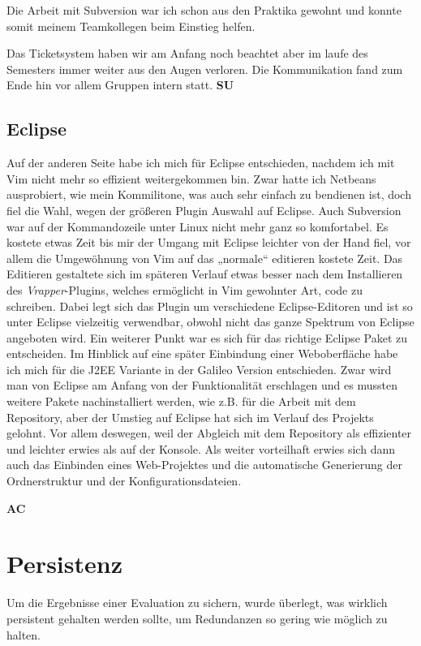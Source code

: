 \documentclass[titlepage, 12pt,a4paper]{scrartcl}
\begin{document}
Die Arbeit mit Subversion war ich schon aus den Praktika gewohnt und konnte
somit meinem Teamkollegen beim Einstieg helfen.

Das Ticketsystem haben wir am Anfang noch beachtet aber im laufe des Semesters
immer weiter aus den Augen verloren. Die Kommunikation fand zum Ende hin vor allem
Gruppen intern statt.
{\bf{SU}}

\subsection{Eclipse}
Auf der anderen Seite habe ich mich für Eclipse entschieden, nachdem ich mit
Vim nicht mehr so effizient weitergekommen bin. Zwar hatte ich Netbeans
ausprobiert, wie mein Kommilitone, was auch sehr einfach zu bendienen ist, doch
fiel die Wahl, wegen der größeren Plugin Auswahl auf Eclipse. Auch Subversion
war auf der Kommandozeile unter Linux nicht mehr ganz so komfortabel. Es kostete
etwas Zeit bis mir der Umgang mit Eclipse leichter von der Hand fiel, vor allem
die Umgewöhnung von Vim auf das „normale“ editieren kostete Zeit. Das Editieren
gestaltete sich im späteren Verlauf etwas besser nach dem Installieren des
\emph{Vrapper}-Plugins, welches ermöglicht in Vim gewohnter Art, code zu
schreiben. Dabei legt sich das Plugin um verschiedene Eclipse-Editoren und ist
so unter Eclipse vielzeitig verwendbar, obwohl nicht das ganze Spektrum von
Eclipse angeboten wird. Ein weiterer Punkt war es sich für das richtige Eclipse
Paket zu entscheiden. Im Hinblick auf eine später Einbindung einer
Weboberfläche habe ich mich für die J2EE Variante in der Galileo Version
entschieden. Zwar wird man von Eclipse am Anfang von der Funktionalität
erschlagen und es mussten weitere Pakete nachinstalliert werden, wie z.B. für
die Arbeit mit dem Repository, aber der Umstieg auf Eclipse hat sich im Verlauf
des Projekts gelohnt. Vor allem deswegen, weil der Abgleich mit dem Repository
als effizienter und leichter erwies als auf der Konsole. Als weiter vorteilhaft
erwies sich dann auch das Einbinden eines Web-Projektes und die automatische
Generierung der Ordnerstruktur und der Konfigurationsdateien.


{\bf{AC}}


\section{Persistenz}
Um die Ergebnisse einer Evaluation zu sichern, wurde überlegt, was wirklich
persistent gehalten werden sollte, um Redundanzen so gering wie möglich zu
halten.
\end{document}
